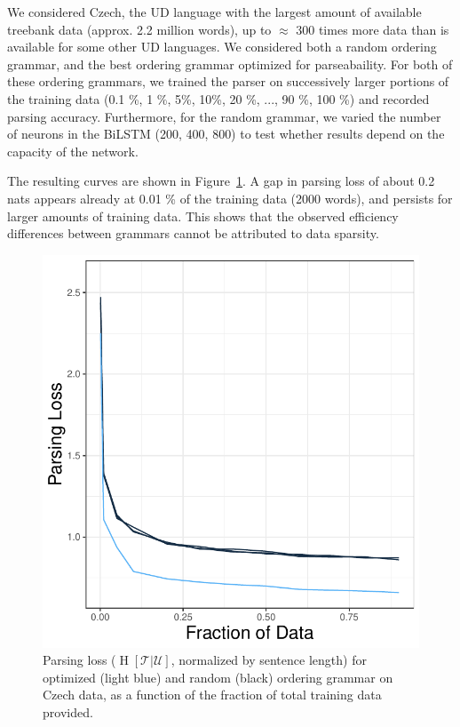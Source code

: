 \documentclass[10pt,twoside,lineno]{article}
\newcommand{\utterance}{\mathcal{U}}
\newcommand{\tree}{\mathcal{T}}
\begin{document}
We considered Czech, the UD language with the largest amount of available treebank data (approx. 2.2 million words), up to $\approx$ 300 times more data than is available for some other UD languages.
We considered both a random ordering grammar, and the best ordering grammar optimized for parseabaility.
For both of these ordering grammars, we trained the parser on successively larger portions of the training data (0.1 \%, 1 \%, 5\%, 10\%, 20 \%, ..., 90 \%, 100 \%) and recorded parsing accuracy.
Furthermore, for the random grammar, we varied the number of neurons in the BiLSTM (200, 400, 800) to test whether results depend on the capacity of the network.


The resulting curves are shown in Figure~\ref{fig:learning-czech}.
A gap in parsing loss of about 0.2 nats appears already at 0.01 \% of the training data (2000 words), and persists for larger amounts of training data.
This shows that the observed efficiency differences between grammars cannot be attributed to data sparsity. 

\begin{figure}[ht]
    \centering
    \includegraphics[scale=.4]{../results/learning-curves/figures/learning-parser-czech-logloss.pdf} 

	\caption{Parsing loss ($\operatorname{H}[\tree|\utterance]$, normalized by sentence length) for optimized (light blue) and random (black) ordering grammar on Czech data, as a function of the fraction of total training data provided.}
    \label{fig:learning-czech}
\end{figure}
\end{document}
